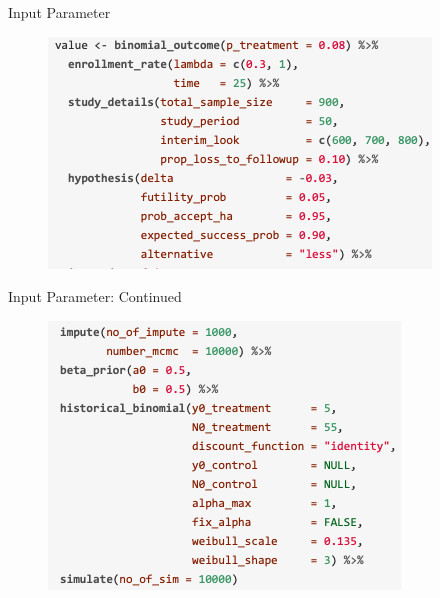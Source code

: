 \documentclass[12pt,t]{beamer}
\begin{document}

\begin{frame}{Input Parameter}
\begin{figure}
\includegraphics[width=0.9\linewidth]{Images/input1.png}
\end{figure}
\end{frame}


\begin{frame}{Input Parameter: Continued}
\begin{figure}
\includegraphics[width=0.8\linewidth]{Images/input2.png}
\end{figure}
\end{frame}

\end{document}
